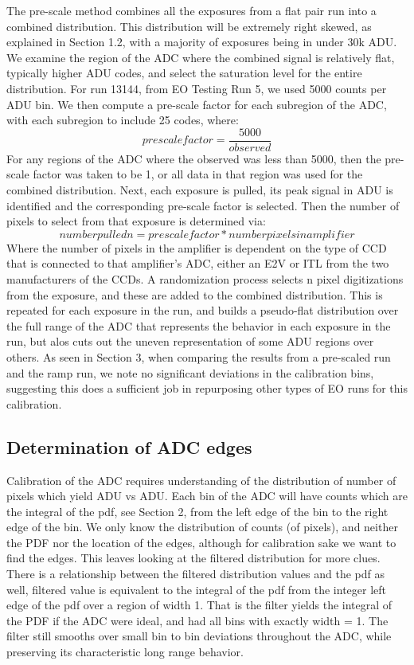 \documentclass[11pt, letterpaper]{article}
\begin{document}
The pre-scale method combines all the exposures from a flat pair run into a combined distribution. 
This distribution will be extremely right skewed, as explained in Section 1.2, with a majority of exposures being in under 30k ADU. 
We examine the region of the ADC where the combined signal is relatively flat, typically higher ADU codes, and select the saturation level for the entire distribution. For run 13144, from EO Testing Run 5, we used 5000 counts per ADU bin. 
 We then compute a pre-scale factor for each subregion of the ADC, with each subregion to include 25 codes, where:
  \[ prescale factor = \frac{5000}{observed}\]
 For any regions of the ADC where the observed was less than 5000, then the pre-scale factor was taken to be 1, or all data in that region was used for the combined distribution. 
Next, each exposure is pulled, its peak signal in ADU is identified and the corresponding pre-scale factor is selected. 
Then the number of pixels to select from that exposure is determined via: 
\[ number pulled n = prescale factor*number pixels in amplifier \]
Where the number of pixels in the amplifier is dependent on the type of CCD that is connected to that amplifier's ADC, either an E2V or ITL from the two manufacturers of the CCDs. 
A randomization process selects n pixel digitizations from the exposure, and these are added to the combined distribution. 
This is repeated for each exposure in the run, and builds a pseudo-flat distribution over the full range of the ADC that represents the behavior in each exposure in the run, but alos cuts out the uneven representation of some ADU regions over others. 
As seen in Section 3, when comparing the results from a pre-scaled run and the ramp run, we note no significant deviations in the calibration bins, suggesting this does a sufficient job in repurposing other types of EO runs for this calibration. 

\subsection{Determination of ADC edges} 	
\indent

Calibration of the ADC requires understanding of the distribution of number of pixels which yield ADU vs ADU. 
Each bin of the ADC will have counts which are the integral of the pdf, see Section 2, from the left edge of the bin to the right edge of the bin. 
We only know the distribution of counts (of pixels), and neither the PDF nor the location of the edges, although for calibration sake we want to find the edges. 
This leaves looking at the filtered distribution for more clues. 
There is a relationship between the filtered distribution values and the pdf as well, filtered value is equivalent to the integral of the pdf from the integer left edge of the pdf over a region of width 1. 
That is the filter yields the integral of the PDF if the ADC were ideal, and had all bins with exactly width = 1. 
The filter still smooths over small bin to bin deviations throughout the ADC, while preserving its characteristic long range behavior. 
\indent 
\end{document}

